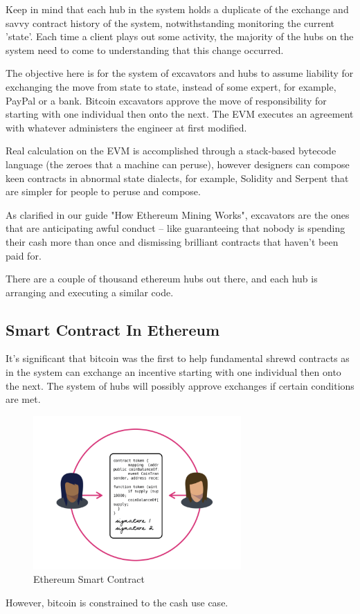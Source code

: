 Keep in mind that each hub in the system holds a duplicate of the exchange and savvy contract history of the system, notwithstanding monitoring the current 'state'. Each time a client plays out some activity, the majority of the hubs on the system need to come to understanding that this change occurred. 

The objective here is for the system of excavators and hubs to assume liability for exchanging the move from state to state, instead of some expert, for example, PayPal or a bank. Bitcoin excavators approve the move of responsibility for starting with one individual then onto the next. The EVM executes an agreement with whatever administers the engineer at first modified. 

Real calculation on the EVM is accomplished through a stack-based bytecode language (the zeroes that a machine can peruse), however designers can compose keen contracts in abnormal state dialects, for example, Solidity and Serpent that are simpler for people to peruse and compose. 

As clarified in our guide "How Ethereum Mining Works", excavators are the ones that are anticipating awful conduct – like guaranteeing that nobody is spending their cash more than once and dismissing brilliant contracts that haven't been paid for. 

There are a couple of thousand ethereum hubs out there, and each hub is arranging and executing a similar code.


\subsection{Smart Contract In Ethereum}
It's significant that bitcoin was the first to help fundamental shrewd contracts as in the system can exchange an incentive starting with one individual then onto the next. The system of hubs will possibly approve exchanges if certain conditions are met. 
\begin{figure}[h]
	\centering
	\includegraphics[width=300px]{figures/Ethereum/03.png}
	\caption{Ethereum Smart Contract}
	\label{fig:ipfs1}
\end{figure}
However, bitcoin is constrained to the cash use case. 

